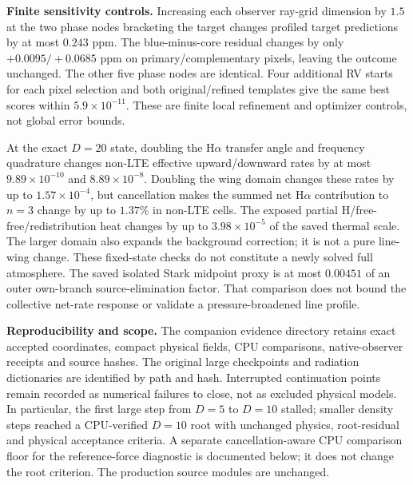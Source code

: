 \textbf{Finite sensitivity controls.}
Increasing each observer ray-grid dimension by $1.5$ at the two phase nodes
bracketing the target changes profiled target predictions by at most
$0.243$ ppm. The blue-minus-core residual changes by only
$+0.0095/+0.0685$ ppm on primary/complementary pixels, leaving the outcome
unchanged. The other five phase nodes are identical. Four additional RV
starts for each pixel selection and both original/refined templates give
the same best scores within $5.9\times10^{-11}$. These are finite local
refinement and optimizer controls, not global error bounds.

At the exact $D=20$ state, doubling the H$\alpha$ transfer angle and frequency
quadrature changes non-LTE effective upward/downward rates by at most
$9.89\times10^{-10}$ and $8.89\times10^{-8}$. Doubling the wing domain
changes these rates by up to $1.57\times10^{-4}$, but cancellation makes
the summed net H$\alpha$ contribution to $n=3$ change by up to $1.37\%$
in non-LTE cells. The exposed partial H/free-free/redistribution heat changes
by up to $3.98\times10^{-5}$ of the saved thermal scale. The larger domain
also expands the background correction; it is not a pure line-wing change.
These fixed-state checks do not constitute a newly solved full atmosphere.
The saved isolated Stark midpoint proxy is at most $0.00451$ of an outer
own-branch source-elimination factor. That comparison does not bound the
collective net-rate response or validate a pressure-broadened line profile.

\textbf{Reproducibility and scope.}
The companion evidence directory retains exact accepted coordinates,
compact physical fields, CPU comparisons, native-observer receipts and
source hashes. The original large checkpoints and radiation dictionaries
are identified by path and hash. Interrupted continuation points remain
recorded as numerical failures to close, not as excluded physical models.
In particular, the first large step from $D=5$ to $D=10$ stalled; smaller
density steps reached a CPU-verified $D=10$ root with unchanged physics,
root-residual and physical acceptance criteria. A separate cancellation-aware
CPU comparison floor for the reference-force diagnostic is documented below;
it does not change the root criterion. The production source modules are unchanged.
